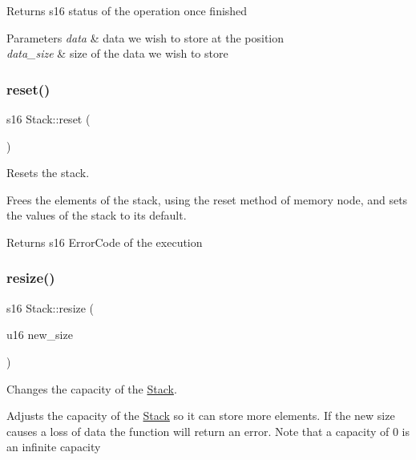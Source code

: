 \begin{DoxyReturn}{Returns}
s16 status of the operation once finished 
\end{DoxyReturn}

\begin{DoxyParams}{Parameters}
{\em data} & data we wish to store at the position \\
\hline
{\em data\+\_\+size} & size of the data we wish to store \\
\hline
\end{DoxyParams}
\mbox{\label{class_stack_a2f7b55c0ee432748d78175f3d830ce27}} 
\subsubsection{\texorpdfstring{reset()}{reset()}}
{\footnotesize\ttfamily s16 Stack\+::reset (\begin{DoxyParamCaption}{ }\end{DoxyParamCaption})}



Resets the stack. 

Frees the elements of the stack, using the reset method of memory node, and sets the values of the stack to it\textquotesingle{}s default.

\begin{DoxyReturn}{Returns}
s16 Error\+Code of the execution 
\end{DoxyReturn}
\mbox{\label{class_stack_ae210ae6778f978313659fbd7aa59fc6c}} 
\subsubsection{\texorpdfstring{resize()}{resize()}}
{\footnotesize\ttfamily s16 Stack\+::resize (\begin{DoxyParamCaption}\item[{u16}]{new\+\_\+size }\end{DoxyParamCaption})}



Changes the capacity of the \hyperlink{class_stack}{Stack}. 

Adjusts the capacity of the \hyperlink{class_stack}{Stack} so it can store more elements. If the new size causes a loss of data the function will return an error. Note that a capacity of 0 is an infinite capacity


